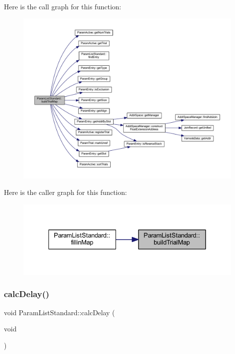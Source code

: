Here is the call graph for this function\+:
\nopagebreak
\begin{figure}[H]
\begin{center}
\leavevmode
\includegraphics[width=350pt]{class_param_list_standard_ad417701f25ded842e652c57cf8216fad_cgraph}
\end{center}
\end{figure}
Here is the caller graph for this function\+:
\nopagebreak
\begin{figure}[H]
\begin{center}
\leavevmode
\includegraphics[width=328pt]{class_param_list_standard_ad417701f25ded842e652c57cf8216fad_icgraph}
\end{center}
\end{figure}
\mbox{\label{class_param_list_standard_a0157393aeb32898f19740e548309d594}} 
\subsubsection{\texorpdfstring{calcDelay()}{calcDelay()}}
{\footnotesize\ttfamily void Param\+List\+Standard\+::calc\+Delay (\begin{DoxyParamCaption}\item[{void}]{ }\end{DoxyParamCaption})\hspace{0.3cm}{\ttfamily [protected]}}



